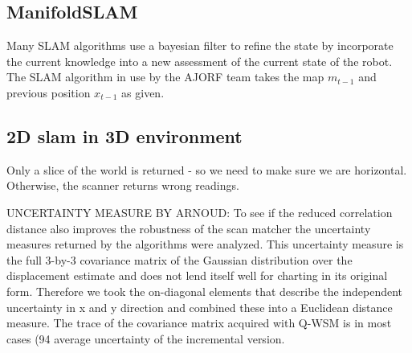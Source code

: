 \subsection{ManifoldSLAM}
Many SLAM algorithms use a bayesian filter to refine the state by incorporate the current knowledge into a new assessment of the current state of the robot. The SLAM algorithm in use by the AJORF team takes the map $m_{t-1}$ and previous position $x_{t-1}$ as given. 


\subsection{2D slam in 3D environment}
Only a slice of the world is returned - so we need to make sure we are horizontal. Otherwise, the scanner returns wrong readings.


UNCERTAINTY MEASURE BY ARNOUD:
To see if the reduced correlation distance also improves the robustness of
the scan matcher the uncertainty measures returned by the algorithms were
analyzed. This uncertainty measure is the full 3-by-3 covariance matrix of the
Gaussian distribution over the displacement estimate and does not lend itself well
for charting in its original form. Therefore we took the on-diagonal elements that
describe the independent uncertainty in x and y direction and combined these
into a Euclidean distance measure. The trace of the covariance matrix acquired
with Q-WSM is in most cases (94%
average uncertainty of the incremental version.


